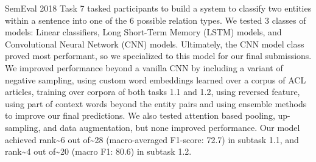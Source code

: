 SemEval 2018 Task 7 tasked participants to build a system to classify two entities within a sentence into one of the 6 possible relation types. We tested 3 classes of models: Linear classifiers, Long Short-Term Memory (LSTM) models, and Convolutional Neural Network (CNN) models. Ultimately, the CNN model class proved most performant, so we specialized to this model for our final submissions. We improved performance beyond a vanilla CNN by including a variant of negative sampling, using custom word embeddings learned over a corpus of ACL articles, training over corpora of both tasks 1.1 and 1.2, using reversed feature, using part of context words beyond the entity pairs and using ensemble methods to improve our final predictions. We also tested attention based pooling, up-sampling, and data augmentation, but none improved performance. Our model achieved rank{\textasciitilde}6  out of{\textasciitilde}28 (macro-averaged F1-score: 72.7) in subtask 1.1, and rank{\textasciitilde}4 out of{\textasciitilde}20 (macro F1: 80.6) in subtask 1.2.
